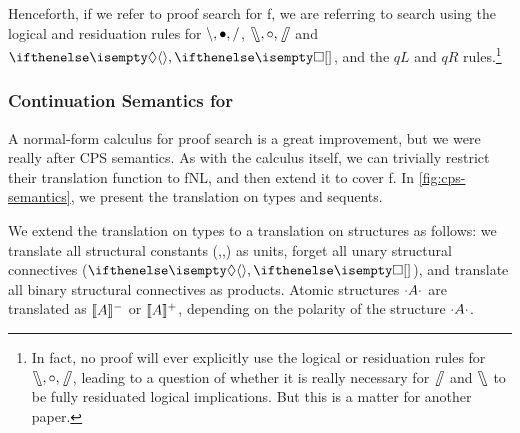 \documentclass[10pt,a4paper]{llncs}
\begin{document}
Henceforth, if we refer to proof search for {f\NLCL}, we are referring
to search using the logical and residuation rules for $\mathbin{\backslash}, \bullet,
\mathbin{\slash}$, $\fatbslash, \mathbin{\circ}, \mathbin{\!\fatslash\,}$ and $\di, \sq$, and the $qL$ and $qR$
rules.\footnote{%
  In fact, no proof will ever explicitly use the logical or
  residuation rules for $\fatbslash, \mathbin{\circ}, \mathbin{\!\fatslash\,}$, leading to a
  question of whether it is really necessary for $\mathbin{\!\fatslash\,}$ and $\fatbslash$
  to be fully residuated logical implications. But this is a matter
  for another paper.
}

\subsubsection{Continuation Semantics for {\NLCL}}%
\label{sec:continuation-semantics-2}

A normal-form calculus for proof search is a great improvement, but
we were really after  CPS
semantics.
As with the calculus itself, we can trivially restrict their
translation function to fNL, and then extend it to cover {f\NLCL}.
In \autoref{fig:cps-semantics}, we present the translation on types
and sequents.



We extend the translation on types to a translation on structures as
follows: we translate all structural constants (\I,\B,\C) as units,
forget all unary structural connectives ($\di,\sq$), and translate all
binary structural connectives as products. Atomic structures $\cdot A \cdot$
are translated as $\llbracket{A}\rrbracket^-$ or $\llbracket{A}\rrbracket^+$, depending on the polarity
of the structure $\cdot A \cdot$.
\end{document}
